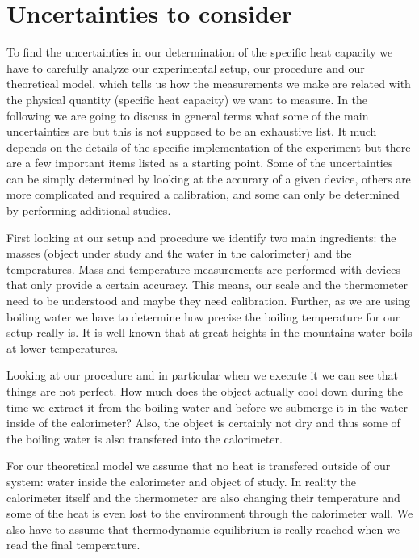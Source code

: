 \documentclass[10pt,aps,twocolumn,secnumarabic,balancelastpage,amsmath,amssymb,nofootinbib,floatfix]{revtex4}
\begin{document}
\section{Uncertainties to consider}

To find the uncertainties in our determination of the specific heat capacity we have to carefully analyze our experimental setup, our procedure and our theoretical model, which tells us how the measurements we make are related with the physical quantity (specific heat capacity) we want to measure. In the following we are going to discuss in general terms what some of the main uncertainties are but this is not supposed to be an exhaustive list. It much depends on the details of the specific implementation of the experiment but there are a few important items listed as a starting point. Some of the uncertainties can be simply determined by looking at the accurary of a given device, others are more complicated and required a calibration, and some can only be determined by performing additional studies.

First looking at our setup and procedure we identify two main ingredients: the masses (object under study and the water in the calorimeter) and the temperatures. Mass and temperature measurements are performed with devices that only provide a certain accuracy. This means, our scale and the thermometer need to be understood and maybe they need calibration. Further, as we are using boiling water we have to determine how precise the boiling temperature for our setup really is. It is well known that at great heights in the mountains water boils at lower temperatures.

Looking at our procedure and in particular when we execute it we can see that things are not perfect. How much does the object actually cool down during the time we extract it from the boiling water and before we submerge it in the water inside of the calorimeter? Also, the object is certainly not dry and thus some of the boiling water is also transfered into the calorimeter.

For our theoretical model we assume that no heat is transfered outside of our system: water inside the calorimeter and object of study. In reality the calorimeter itself and the thermometer are also changing their temperature and some of the heat is even lost to the environment through the calorimeter wall. We also have to assume that thermodynamic equilibrium is really reached when we read the final temperature.
\end{document}
